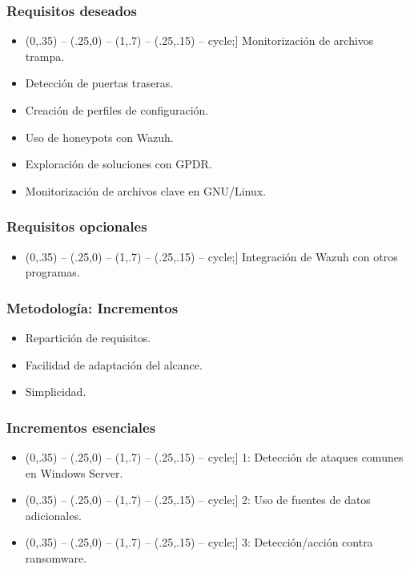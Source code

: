 \documentclass[a4paper,10pt]{beamer}
\def\checkmark{\tikz\fill[scale=0.4,color=black!30!green](0,.35) -- (.25,0) -- (1,.7) -- (.25,.15) -- cycle;}
\def\crossmark{\textcolor{black!10!red}{X\ }}
\begin{document}
\begin{frame}[fragile]
	\frametitle{Requisitos deseados}

	\begin{itemize}
		\item[\checkmark] Monitorización de archivos trampa.
		\item[\crossmark] Detección de puertas traseras.
		\item[\crossmark] Creación de perfiles de configuración.
		\item[\crossmark] Uso de honeypots con Wazuh.
		\item[\crossmark] Exploración de soluciones con GPDR.
		\item[\crossmark] Monitorización de archivos clave en GNU/Linux.
	\end{itemize}
\end{frame}

\begin{frame}[fragile]
	\frametitle{Requisitos opcionales}

	\begin{itemize}
		\item[\checkmark] Integración de Wazuh con otros programas. %
	\end{itemize}
\end{frame}

\begin{frame}[fragile]
	\frametitle{Metodología: Incrementos}

	\begin{itemize}
		\item Repartición de requisitos.
		\item Facilidad de adaptación del alcance.
		\item Simplicidad.
	\end{itemize}
\end{frame}

\begin{frame}[fragile]
	\frametitle{Incrementos esenciales}

	\begin{itemize}
		\item[\checkmark] 1: Detección de ataques comunes en Windows Server.
		\item[\checkmark] 2: Uso de fuentes de datos adicionales.
		\item[\checkmark] 3: Detección/acción contra ransomware.
	\end{itemize}
\end{frame}
\end{document}
